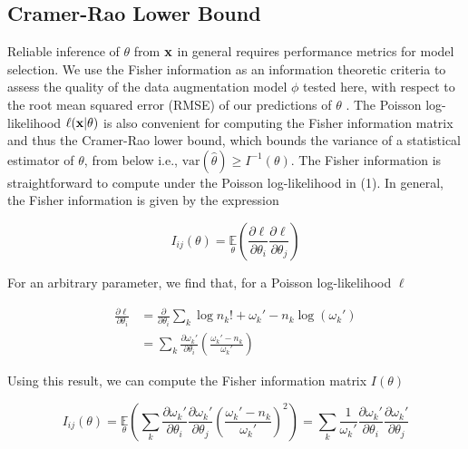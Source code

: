 \documentclass{article}
\begin{document}


\subsection{Cramer-Rao Lower Bound}

Reliable inference of $\theta$ from $\bold{x}$ in general requires performance metrics for model selection. We use the Fisher information as an information theoretic criteria to assess the quality of the data augmentation model $\phi$ tested here, with respect to the root mean squared error (RMSE) of our predictions of $\theta$ \citep{Chao2016}. The Poisson log-likelihood $\ell(\bold{x}|\theta)$ is also convenient for computing the Fisher information matrix \citep{Smith2010} and thus the Cramer-Rao lower bound, which bounds the variance of a statistical estimator of $\theta$, from below i.e., $\mathrm{var}(\hat{\theta}) \geq I^{-1}(\theta)$. The Fisher information is straightforward to compute under the Poisson log-likelihood in (1). In general, the Fisher information is given by the expression

\begin{equation}
I_{ij}(\theta) = \underset{\theta}{\mathbb{E}}\left(\frac{\partial \ell}{\partial\theta_{i}}\frac{\partial\ell}{\partial\theta_{j}}\right) 
\end{equation}

For an arbitrary parameter, we find that, for a Poisson log-likelihood $\ell$

\begin{align*}
\frac{\partial \ell}{\partial \theta_{i}} &= \frac{\partial}{\partial \theta_{i}} \sum_{k}  \log n_{k}! + \omega_{k}' - n_{k}\log\left(\omega_{k}'\right)\\
&= \sum_{k} \frac{\partial \omega_{k}'}{\partial\theta_{i}} \left(\frac{\omega_{k}'-n_{k}}{\omega_{k}'}\right)
\end{align*}

Using this result, we can compute the Fisher information matrix $I(\theta)$

\begin{equation*}
I_{ij}(\theta) = \underset{\theta}{\mathbb{E}}\left(\sum_{k}\frac{\partial \omega_{k}'}{\partial\theta_{i}}\frac{\partial \omega_{k}'}{\partial\theta_{j}} \left(\frac{\omega_{k}'-n_{k}}{\omega_{k}'}\right)^{2}\right) = \sum_{k}\frac{1}{\omega_{k}'}\frac{\partial \omega_{k}'}{\partial\theta_{i}}\frac{\partial \omega_{k}'}{\partial\theta_{j}}
\end{equation*}
\end{document}
